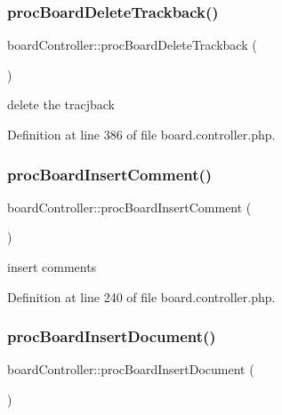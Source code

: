 \subsubsection{\texorpdfstring{proc\+Board\+Delete\+Trackback()}{procBoardDeleteTrackback()}}
{\footnotesize\ttfamily board\+Controller\+::proc\+Board\+Delete\+Trackback (\begin{DoxyParamCaption}{ }\end{DoxyParamCaption})}



delete the tracjback 



Definition at line 386 of file board.\+controller.\+php.

\hypertarget{classboardController_ab643a9d4d386833e92bc2d7114319fb2}{}\label{classboardController_ab643a9d4d386833e92bc2d7114319fb2} 
\subsubsection{\texorpdfstring{proc\+Board\+Insert\+Comment()}{procBoardInsertComment()}}
{\footnotesize\ttfamily board\+Controller\+::proc\+Board\+Insert\+Comment (\begin{DoxyParamCaption}{ }\end{DoxyParamCaption})}



insert comments 



Definition at line 240 of file board.\+controller.\+php.

\hypertarget{classboardController_a14ee978c5be08ee33f4c00a6960c4e60}{}\label{classboardController_a14ee978c5be08ee33f4c00a6960c4e60} 
\subsubsection{\texorpdfstring{proc\+Board\+Insert\+Document()}{procBoardInsertDocument()}}
{\footnotesize\ttfamily board\+Controller\+::proc\+Board\+Insert\+Document (\begin{DoxyParamCaption}{ }\end{DoxyParamCaption})}



